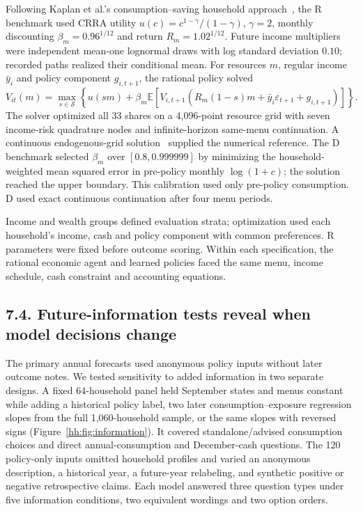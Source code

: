 Following Kaplan et al.'s consumption--saving household approach~\cite{ref32}, the R benchmark used CRRA utility $u(c)=c^{1-\gamma}/(1-\gamma)$, $\gamma=2$, monthly discounting $\beta_m=0.96^{1/12}$ and return $R_m=1.02^{1/12}$. Future income multipliers were independent mean-one lognormal draws with log standard deviation $0.10$; recorded paths realized their conditional mean. For resources $m$, regular income $\bar y_i$ and policy component $g_{i,t+1}$, the rational policy solved
\begin{equation}
 V_{it}(m)=\max_{s\in\mathcal S}\left\{u(sm)+\beta_m\mathbb{E}\left[V_{i,t+1}\!\left(R_m(1-s)m+\bar y_i\varepsilon_{t+1}+g_{i,t+1}\right)\right]\right\}.
 \label{hh:eq:bellman}
\end{equation}
The solver optimized all 33 shares on a 4,096-point resource grid with seven income-risk quadrature nodes and infinite-horizon same-menu continuation. A continuous endogenous-grid solution~\cite{ref43} supplied the numerical reference. The D benchmark selected $\beta_m$ over $[0.8,0.999999]$ by minimizing the household-weighted mean squared error in pre-policy monthly $\log(1+c)$; the solution reached the upper boundary. This calibration used only pre-policy consumption. D used exact continuous continuation after four menu periods.

Income and wealth groups defined evaluation strata; optimization used each household's income, cash and policy component with common preferences. R parameters were fixed before outcome scoring. Within each specification, the rational economic agent and learned policies faced the same menu, income schedule, cash constraint and accounting equations.

\subsection*{7.4. Future-information tests reveal when model decisions change}

The primary annual forecasts used anonymous policy inputs without later outcome notes. We tested sensitivity to added information in two separate designs. A fixed 64-household panel held September states and menus constant while adding a historical policy label, two later consumption--exposure regression slopes from the full 1,060-household sample, or the same slopes with reversed signs (Figure~\ref{hh:fig:information}). It covered standalone/advised consumption choices and direct annual-consumption and December-cash questions. The 120 policy-only inputs omitted household profiles and varied an anonymous description, a historical year, a future-year relabeling, and synthetic positive or negative retrospective claims. Each model answered three question types under five information conditions, two equivalent wordings and two option orders.

